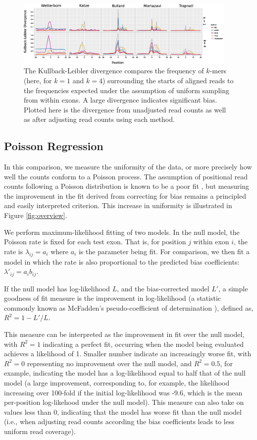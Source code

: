 \documentclass{bioinfo}
\begin{document}
\begin{figure}
\centerline{\includegraphics[width=0.95\textwidth]{kl.eps}}
\caption{The Kullback-Leibler divergence compares the frequency of $k$-mers
(here, for $k = 1$ and $k = 4$) surrounding the starts of aligned reads to the
frequencies expected under the assumption of uniform sampling from within exons.
A large divergence indicates significant bias. Plotted here is the divergence
from unadjusted read counts as well as after adjusting read counts using each
method.}
\label{fig:kl}
\end{figure}


\subsection{Poisson Regression}

In this comparison, we measure the uniformity of the data, or more precisely
how well the counts conform to a Poisson process.  The assumption of positional
read counts following a Poisson distribution is known to be a poor fit
\citep{Srivastava2010}, but measuring the improvement in the fit derived from
correcting for bias remains a principled and easily interpreted criterion. This
increase in uniformity is illustrated in Figure \ref{fig:overview}.

We perform maximum-likelihood fitting of two models. In the null model, the
Poisson rate is fixed for each test exon. That is, for position $j$ within exon $i$,
the rate is $ \lambda_{ij} = a_i $ where $a_i$ is the parameter being fit. For
comparison, we then fit a model in which the rate is also proportional to the
predicted bias coefficients: $ \lambda'_{ij} = a_i b_{ij} $.

If the null model has log-likelihood $L$, and the bias-corrected model $L'$, a
simple goodness of fit measure is the improvement in log-likelihood (a statistic
commonly known as McFadden's pseudo-coefficient of determination
\citep{McFadden1974}), defined as,
$R^2 = 1 - L'/L$.

This measure can be interpreted as the improvement in fit over the null model,
with $R^2 = 1$ indicating a perfect fit, occurring when the model being
evaluated achieves a likelihood of 1. Smaller number indicate an increasingly
worse fit, with $R^2 = 0$ representing no improvement over the null model, and
$R^2 = 0.5$, for example, indicating the model has a log-likelihood equal to
half that of the null model (a large improvement, corresponding to, for example,
the likelihood increasing over 100-fold if the initial log-likelihood was -9.6,
which is the mean per-position log-likehood under the null model). This measure
can also take on values less than 0, indicating that the model has worse fit
than the null model (i.e., when adjusting read counts according the bias
coefficients leads to less uniform read coverage).
\end{document}

